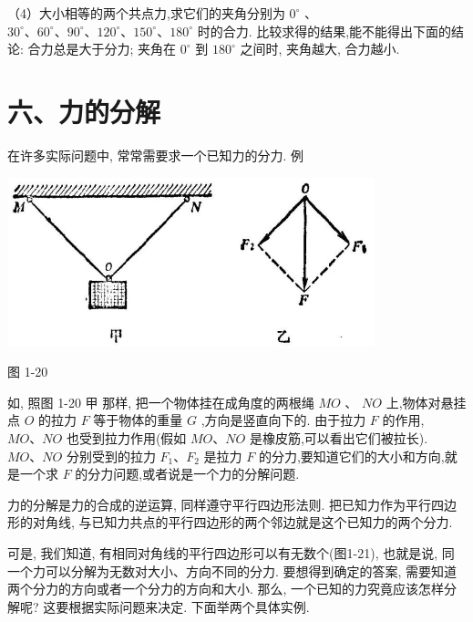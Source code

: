 \documentclass[10pt]{article}
\begin{document}
（4）大小相等的两个共点力,求它们的夹角分别为 \({0}^{ \circ }\) 、 \({30}^{ \circ }\text{、}{60}^{ \circ }\text{、}{90}^{ \circ }\text{、}{120}^{ \circ }\text{、}{150}^{ \circ }\text{、}{180}^{ \circ }\) 时的合力. 比较求得的结果,能不能得出下面的结论: 合力总是大于分力; 夹角在 \({0}^{ \circ }\) 到 \({180}^{ \circ }\) 之间时, 夹角越大, 合力越小.

\section*{六、力的分解}

在许多实际问题中, 常常需要求一个已知力的分力. 例

\begin{center}
\includegraphics[max width=0.8\textwidth]{images/01912d55-147c-70aa-b0e0-1782a122f948_34_119901.jpg}
\end{center}

图 1-20

如, 照图 1-20 甲 那样, 把一个物体挂在成角度的两根绳 \({MO}\) 、 \({NO}\) 上,物体对悬挂点 \(O\) 的拉力 \(F\) 等于物体的重量 \(G\) ,方向是竖直向下的. 由于拉力 \(F\) 的作用, \({MO}\text{、}{NO}\) 也受到拉力作用(假如 \({MO}\text{、}{NO}\) 是橡皮筋,可以看出它们被拉长). \({MO}\text{、}{NO}\) 分别受到的拉力 \({F}_{1}\text{、}{F}_{2}\) 是拉力 \(F\) 的分力,要知道它们的大小和方向,就是一个求 \(F\) 的分力问题,或者说是一个力的分解问题.

力的分解是力的合成的逆运算, 同样遵守平行四边形法则. 把已知力作为平行四边形的对角线, 与已知力共点的平行四边形的两个邻边就是这个已知力的两个分力.

可是, 我们知道, 有相同对角线的平行四边形可以有无数个(图1-21), 也就是说, 同一个力可以分解为无数对大小、方向不同的分力. 要想得到确定的答案, 需要知道两个分力的方向或者一个分力的方向和大小. 那么, 一个已知的力究竟应该怎样分解呢? 这要根据实际问题来决定. 下面举两个具体实例.
\end{document}
